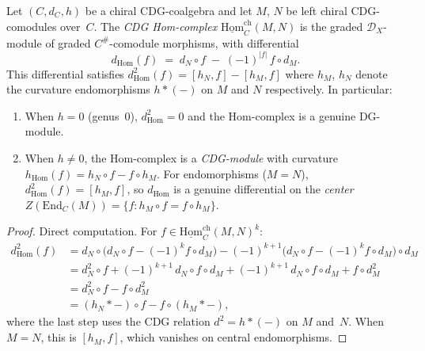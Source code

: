 \begin{proposition}
\label{prop:cdg-hom-complex}
Let $(C, d_C, h)$ be a chiral CDG-coalgebra and let $M$, $N$ be
left chiral CDG-comodules over~$C$.  The \emph{CDG Hom-complex}
$\underline{\mathrm{Hom}}_C^{\mathrm{ch}}(M, N)$ is the graded
$\mathcal{D}_X$-module of graded $C^{\#}$-comodule morphisms,
with differential
\begin{equation}\label{eq:cdg-hom-differential}
d_{\mathrm{Hom}}(f) \;=\; d_N \circ f
\;-\; (-1)^{|f|}\, f \circ d_M.
\end{equation}
This differential satisfies $d_{\mathrm{Hom}}^2(f) = [h_N, f] - [h_M, f]$
where $h_M$, $h_N$ denote the curvature endomorphisms
$h \ast (-)$ on $M$ and $N$ respectively.  In particular:
\begin{enumerate}[label=\textup{(\alph*)}]
\item When $h = 0$ \textup{(}genus~$0$\textup{)},
  $d_{\mathrm{Hom}}^2 = 0$ and the Hom-complex is a genuine
  DG-module.
\item When $h \neq 0$, the Hom-complex is a \emph{CDG-module}
  with curvature $h_{\mathrm{Hom}}(f) = h_N \circ f - f \circ h_M$.
  For endomorphisms ($M = N$),
  $d_{\mathrm{Hom}}^2(f) = [h_M, f]$, so $d_{\mathrm{Hom}}$ is
  a genuine differential on the \emph{center}
  $Z(\mathrm{End}_C(M)) = \{f : h_M \circ f = f \circ h_M\}$.
\end{enumerate}
\end{proposition}

\begin{proof}
Direct computation.  For $f \in \underline{\mathrm{Hom}}_C^{\mathrm{ch}}(M, N)^k$:
\begin{align*}
d_{\mathrm{Hom}}^2(f)
&= d_N \circ \bigl(d_N \circ f - (-1)^k f \circ d_M\bigr)
  - (-1)^{k+1}\bigl(d_N \circ f - (-1)^k f \circ d_M\bigr) \circ d_M \\
&= d_N^2 \circ f + (-1)^{k+1}\, d_N \circ f \circ d_M
  + (-1)^{k+1}\, d_N \circ f \circ d_M + f \circ d_M^2 \\
&= d_N^2 \circ f - f \circ d_M^2 \\
&= (h_N \ast -) \circ f - f \circ (h_M \ast -),
\end{align*}
where the last step uses the CDG relation $d^2 = h \ast (-)$ on
$M$ and~$N$.  When $M = N$, this is $[h_M, f]$, which vanishes
on central endomorphisms.
\end{proof}

